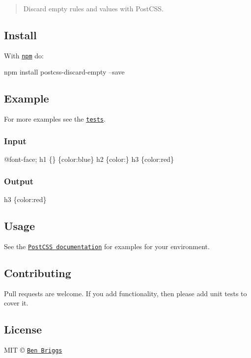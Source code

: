 \begin{quote}
Discard empty rules and values with Post\+C\+SS. \end{quote}


\subsection*{Install}

With \href{https://npmjs.org/package/postcss-discard-empty}{\tt npm} do\+:


\begin{DoxyCode}
npm install postcss-discard-empty --save
\end{DoxyCode}


\subsection*{Example}

For more examples see the \href{test.js}{\tt tests}.

\subsubsection*{Input}


\begin{DoxyCode}
@font-face;
h1 \{\}
\{color:blue\}
h2 \{color:\}
h3 \{color:red\}
\end{DoxyCode}


\subsubsection*{Output}


\begin{DoxyCode}
h3 \{color:red\}
\end{DoxyCode}


\subsection*{Usage}

See the \href{https://github.com/postcss/postcss#usage}{\tt Post\+C\+SS documentation} for examples for your environment.

\subsection*{Contributing}

Pull requests are welcome. If you add functionality, then please add unit tests to cover it.

\subsection*{License}

M\+IT © \href{http://beneb.info}{\tt Ben Briggs} 